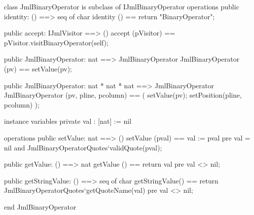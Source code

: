 \begin{vdm_al}
class JmlBinaryOperator is subclass of IJmlBinaryOperator
operations
  public identity: () ==> seq of char
  identity () == return "BinaryOperator";

  public accept: IJmlVisitor ==> ()
  accept (pVisitor) == pVisitor.visitBinaryOperator(self);

  public JmlBinaryOperator: nat ==> JmlBinaryOperator
  JmlBinaryOperator (pv) == setValue(pv);

  public JmlBinaryOperator: nat * nat * nat ==> JmlBinaryOperator
  JmlBinaryOperator (pv, pline, pcolumn) == ( setValue(pv); setPosition(pline, pcolumn) );

instance variables
  private val : [nat] := nil

operations
  public setValue: nat ==> ()
  setValue (pval) == val := pval
    pre val = nil and JmlBinaryOperatorQuotes`validQuote(pval);

  public getValue: () ==> nat
  getValue () == return val
    pre val <> nil;

  public getStringValue: () ==> seq of char
  getStringValue() == return JmlBinaryOperatorQuotes`getQuoteName(val)
    pre val <> nil;

end JmlBinaryOperator
\end{vdm_al}

